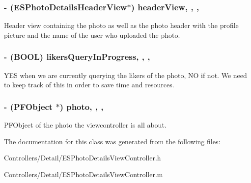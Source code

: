 \subsubsection[{header\+View}]{\setlength{\rightskip}{0pt plus 5cm}-\/ ({\bf E\+S\+Photo\+Details\+Header\+View}$\ast$) header\+View\hspace{0.3cm}{\ttfamily [read]}, {\ttfamily [write]}, {\ttfamily [nonatomic]}, {\ttfamily [strong]}}\label{interface_e_s_photo_details_view_controller_a2878c7bcebda936f94dd1115845270c8}
Header view containing the photo as well as the photo header with the profile picture and the name of the user who uploaded the photo. \hypertarget{interface_e_s_photo_details_view_controller_a9872497a90a81c8e2a95dfb2a939a2de}{}
\subsubsection[{likers\+Query\+In\+Progress}]{\setlength{\rightskip}{0pt plus 5cm}-\/ (B\+O\+O\+L) likers\+Query\+In\+Progress\hspace{0.3cm}{\ttfamily [read]}, {\ttfamily [write]}, {\ttfamily [nonatomic]}, {\ttfamily [assign]}}\label{interface_e_s_photo_details_view_controller_a9872497a90a81c8e2a95dfb2a939a2de}
Y\+E\+S when we are currently querying the likers of the photo, N\+O if not. We need to keep track of this in order to save time and resources. \hypertarget{interface_e_s_photo_details_view_controller_a6d43b7922fdded0e3857d8d6c7216837}{}
\subsubsection[{photo}]{\setlength{\rightskip}{0pt plus 5cm}-\/ (P\+F\+Object $\ast$) photo\hspace{0.3cm}{\ttfamily [read]}, {\ttfamily [write]}, {\ttfamily [nonatomic]}, {\ttfamily [strong]}}\label{interface_e_s_photo_details_view_controller_a6d43b7922fdded0e3857d8d6c7216837}
P\+F\+Object of the photo the viewcontroller is all about. 

The documentation for this class was generated from the following files\+:\begin{DoxyCompactItemize}
\item 
Controllers/\+Detail/E\+S\+Photo\+Details\+View\+Controller.\+h\item 
Controllers/\+Detail/E\+S\+Photo\+Details\+View\+Controller.\+m\end{DoxyCompactItemize}
